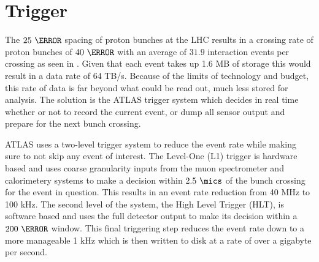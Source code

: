 \section{Trigger} \label{sec:atlas:trigger}

The $25~\ns$ spacing of proton bunches at the LHC results in a crossing rate of
proton bunches of $40~\MHz$ with an average of $31.9$ \pp interaction events per
crossing as seen in .  Given that each event takes up 1.6 MB
of storage this would result in a data rate of 64 TB/s.  Because of the limits
of technology and budget, this rate of data is far beyond what could be read
out, much less stored for analysis. The solution is the ATLAS trigger system
which decides in real time whether or not to record the current event, or dump
all sensor output and prepare for the next bunch crossing.

ATLAS uses a two-level trigger system to reduce the event rate while making
sure to not skip any event of interest.  The Level-One (L1) trigger is hardware
based and uses coarse granularity inputs from the muon spectrometer and
calorimetery systems to make a decision within $2.5~\mics$ of the bunch
crossing for the event in question. This results in an event rate reduction from
40 MHz to 100 kHz.  The second level of the system, the High Level Trigger
(HLT), is software based and uses the full detector output to make its decision
within a $200~\ms$ window. This final triggering step reduces the event rate down
to a more manageable 1 kHz which is then written to disk at a rate of over a
gigabyte per second.
